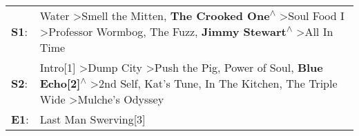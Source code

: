 \begin{supertabular}{p{0.03\textwidth}p{0.92\textwidth}}
 \textbf{S1}:  &                                                                Water\textsuperscript{} \textgreater \enspace Smell the Mitten\textsuperscript{}, \enspace \textbf{The Crooked One\textsuperscript{$\wedge$}} \textgreater \enspace Soul Food I\textsuperscript{} \textgreater \enspace Professor Wormbog\textsuperscript{}, \enspace The Fuzz\textsuperscript{}, \enspace \textbf{Jimmy Stewart\textsuperscript{$\wedge$}} \textgreater \enspace All In Time\textsuperscript{}  \enspace  \\
 \textbf{S2}:  &  Intro[1]\textsuperscript{} \textgreater \enspace Dump City\textsuperscript{} \textgreater \enspace Push the Pig\textsuperscript{}, \enspace Power of Soul\textsuperscript{}, \enspace \textbf{Blue Echo[2]\textsuperscript{$\wedge$}} \textgreater \enspace 2nd Self\textsuperscript{}, \enspace Kat's Tune\textsuperscript{}, \enspace In The Kitchen\textsuperscript{}, \enspace The Triple Wide\textsuperscript{} \textgreater \enspace Mulche's Odyssey\textsuperscript{}  \enspace  \\
 \textbf{E1}:  &                                                                                                                                                                                                                                                                                                                                                                                                                                         Last Man Swerving[3]\textsuperscript{}  \enspace  \\
\end{supertabular}
